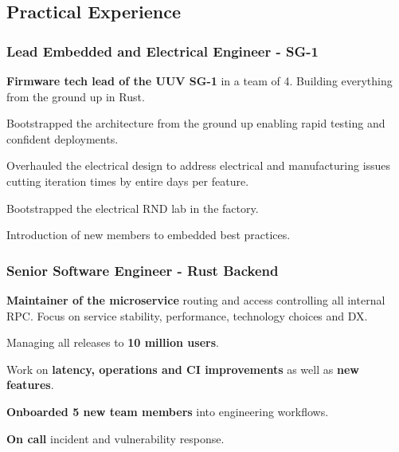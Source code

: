     \begin{timeline}
    
    
    \subsection{Practical Experience}

    \subsubsection{Lead Embedded and Electrical Engineer - SG-1}
    \textbf{Firmware tech lead of the UUV SG-1} in a team of 4. Building everything from the ground up in Rust.
    \begin{tightemize}
        \item Bootstrapped the architecture from the ground up enabling rapid testing and confident deployments.
        \item Overhauled the electrical design to address electrical and manufacturing issues cutting iteration times by entire days per feature.
        \item Bootstrapped the electrical RND lab in the factory.
        \item Introduction of new members to embedded best practices.
    \end{tightemize}
    \sectionsep

    \subsubsection{Senior Software Engineer - Rust Backend}
    \textbf{Maintainer of the microservice} routing and access controlling all internal RPC.
    Focus on service stability, performance, technology choices and DX.
    \begin{tightemize}
        \item Managing all releases to \textbf{10 million users}.
        \item Work on \textbf{latency, operations and CI improvements} as well as \textbf{new features}.
        \item \textbf{Onboarded 5 new team members} into engineering workflows.
        \item \textbf{On call} incident and vulnerability response.
    \end{tightemize}
    \sectionsep


\end{timeline}
